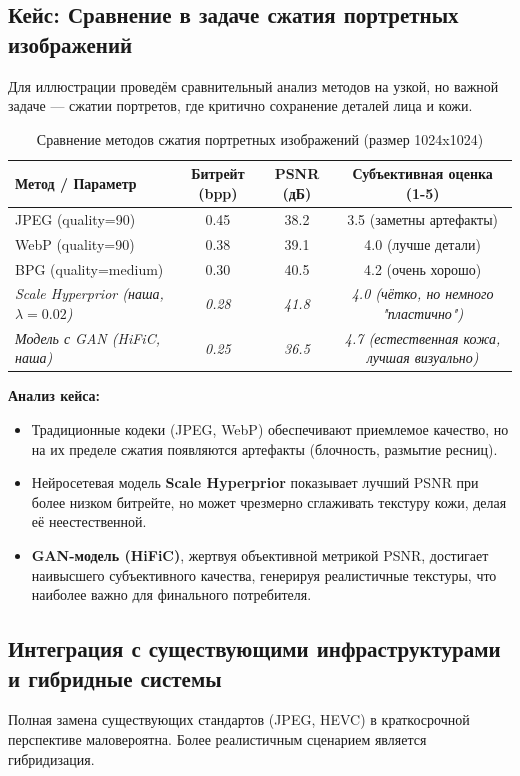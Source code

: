 \subsection{Кейс: Сравнение в задаче сжатия портретных изображений}
Для иллюстрации проведём сравнительный анализ методов на узкой, но важной задаче — сжатии портретов, где критично сохранение деталей лица и кожи.

\begin{table}[h]
\centering
\small
\caption{Сравнение методов сжатия портретных изображений (размер 1024x1024)}
\label{tab:portrait_case}
\begin{tabular}{|l|c|c|c|}
\hline
\textbf{Метод / Параметр} & \textbf{Битрейт (bpp)} & \textbf{PSNR (дБ)} & \textbf{Субъективная оценка (1-5)} \\
\hline
JPEG (quality=90) & 0.45 & 38.2 & 3.5 (заметны артефакты) \\
\hline
WebP (quality=90) & 0.38 & 39.1 & 4.0 (лучше детали) \\
\hline
BPG (quality=medium) & 0.30 & 40.5 & 4.2 (очень хорошо) \\
\hline
\textit{Scale Hyperprior (наша, $\lambda=0.02$)} & \textit{0.28} & \textit{41.8} & \textit{4.0 (чётко, но немного "пластично")} \\
\hline
\textit{Модель с GAN (HiFiC, наша)} & \textit{0.25} & \textit{36.5} & \textit{4.7 (естественная кожа, лучшая визуально)} \\
\hline
\end{tabular}
\end{table}

\noindent \textbf{Анализ кейса:}
\begin{itemize}
\item Традиционные кодеки (JPEG, WebP) обеспечивают приемлемое качество, но на их пределе сжатия появляются артефакты (блочность, размытие ресниц).
\item Нейросетевая модель \textbf{Scale Hyperprior} показывает лучший PSNR при более низком битрейте, но может чрезмерно сглаживать текстуру кожи, делая её неестественной.
\item \textbf{GAN-модель (HiFiC)}, жертвуя объективной метрикой PSNR, достигает наивысшего субъективного качества, генерируя реалистичные текстуры, что наиболее важно для финального потребителя.
\end{itemize}

\subsection{Интеграция с существующими инфраструктурами и гибридные системы}
Полная замена существующих стандартов (JPEG, HEVC) в краткосрочной перспективе маловероятна. Более реалистичным сценарием является гибридизация.

